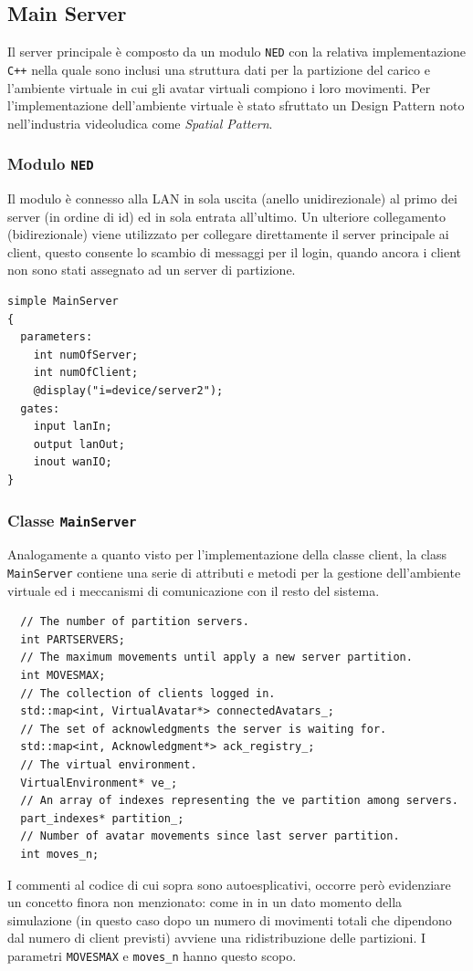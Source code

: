 \documentclass[a4paper, 11pt, oneside]{book}
\theoremstyle{definition}
\theoremstyle{remark}
\begin{document}
\subsection{Main Server}
Il server principale è composto da un modulo \texttt{NED} con la relativa
implementazione \texttt{C++} nella quale sono inclusi una struttura dati per
la partizione del carico e l'ambiente virtuale in cui gli avatar virtuali
compiono i loro movimenti. Per l'implementazione dell'ambiente virtuale è stato
sfruttato un Design Pattern noto nell'industria videoludica
\cite{GamePattern}
come \emph{Spatial Pattern}.

\subsubsection{Modulo \texttt{NED}}
Il modulo è connesso alla LAN in sola uscita (anello unidirezionale) al primo
dei server (in ordine di id) ed in sola entrata all'ultimo. Un ulteriore
collegamento (bidirezionale) viene utilizzato per collegare direttamente
il server principale ai client, questo consente lo scambio di messaggi per
il login, quando ancora i client non sono stati assegnato ad un server di
partizione.
\begin{lstlisting}
simple MainServer
{
  parameters:
    int numOfServer;
    int numOfClient;
    @display("i=device/server2");
  gates:
    input lanIn;
    output lanOut;
    inout wanIO;
}
\end{lstlisting}

\subsubsection{Classe \texttt{MainServer}}
Analogamente a quanto visto per l'implementazione della classe client, la
class \texttt{MainServer} contiene una serie di attributi e metodi per
la gestione dell'ambiente virtuale ed i meccanismi di comunicazione con
il resto del sistema.
\begin{lstlisting}
  // The number of partition servers.
  int PARTSERVERS;
  // The maximum movements until apply a new server partition.
  int MOVESMAX;
  // The collection of clients logged in.
  std::map<int, VirtualAvatar*> connectedAvatars_;
  // The set of acknowledgments the server is waiting for.
  std::map<int, Acknowledgment*> ack_registry_;
  // The virtual environment.
  VirtualEnvironment* ve_;
  // An array of indexes representing the ve partition among servers.
  part_indexes* partition_;
  // Number of avatar movements since last server partition.
  int moves_n;
\end{lstlisting}
I commenti al codice di cui sopra sono autoesplicativi, occorre però evidenziare
un concetto finora non menzionato: come in \cite{IDVE} in un dato momento
della simulazione (in questo caso dopo un numero di movimenti totali che
dipendono dal numero di client previsti) avviene una ridistribuzione delle
partizioni. I parametri \texttt{MOVESMAX} e \texttt{moves\_n} hanno questo
scopo.
\end{document}
